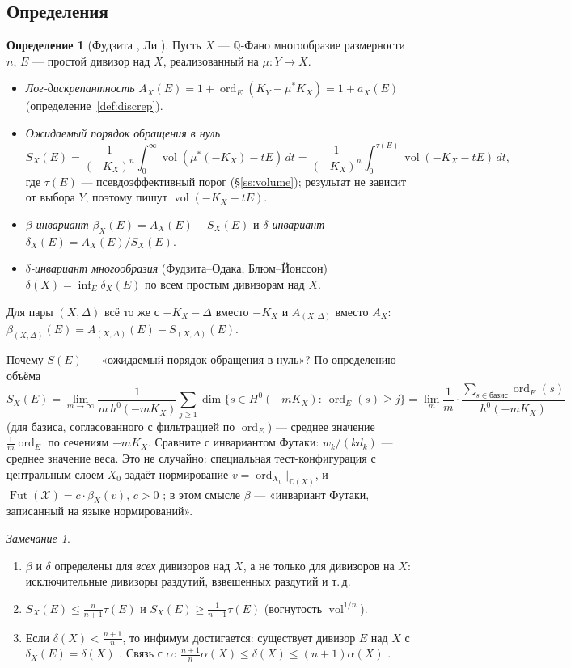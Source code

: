 \documentclass[11pt,a4paper]{article}
\theoremstyle{plain}
\theoremstyle{definition}
\newtheorem{definition}[theorem]{Определение}
\theoremstyle{remark}
\newtheorem{remark}[theorem]{Замечание}
\renewcommand{\C}{\mathbb{C}}
\newcommand{\Q}{\mathbb{Q}}
\newcommand{\cX}{\mathcal{X}}
\DeclareMathOperator{\ord}{ord}
\DeclareMathOperator{\vol}{vol}
\DeclareMathOperator{\Fut}{Fut}
\begin{document}
\subsection{Определения}

\begin{definition}[{Фудзита \cite{Fuj19b}, Ли \cite{Li17}}]\label{def:beta}
Пусть $X$ --- $\Q$-Фано многообразие размерности $n$, $E$ --- простой дивизор над $X$,
реализованный на $\mu\colon Y\to X$.
\begin{itemize}
\item \emph{Лог-дискрепантность} $A_X(E)=1+\ord_E(K_Y-\mu^*K_X)=1+a_X(E)$ (определение~\ref{def:discrep}).
\item \emph{Ожидаемый порядок обращения в нуль}
\[
S_X(E)=\frac1{(-K_X)^n}\int_0^\infty\vol(\mu^*(-K_X)-tE)\,dt=\frac1{(-K_X)^n}\int_0^{\tau(E)}\vol(-K_X-tE)\,dt ,
\]
где $\tau(E)$ --- псевдоэффективный порог (\S\ref{ss:volume}); результат не зависит от выбора
$Y$, поэтому пишут $\vol(-K_X-tE)$.
\item \emph{$\beta$-инвариант} $\beta_X(E)=A_X(E)-S_X(E)$ и \emph{$\delta$-инвариант}
$\delta_X(E)=A_X(E)/S_X(E)$.
\item \emph{$\delta$-инвариант многообразия} (Фудзита--Одака, Блюм--Йонссон)
$\delta(X)=\inf_E\delta_X(E)$ по всем простым дивизорам над $X$.
\end{itemize}
Для пары $(X,\Delta)$ всё то же с $-K_X-\Delta$ вместо $-K_X$ и $A_{(X,\Delta)}$ вместо $A_X$:
$\beta_{(X,\Delta)}(E)=A_{(X,\Delta)}(E)-S_{(X,\Delta)}(E)$.
\end{definition}

Почему $S(E)$ --- «ожидаемый порядок обращения в нуль»? По определению объёма
\[
S_X(E)=\lim_{m\to\infty}\frac1{m\,h^0(-mK_X)}\sum_{j\ge1}\dim\{s\in H^0(-mK_X):\ \ord_E(s)\ge j\}
=\lim_m\frac{1}{m}\cdot\frac{\sum_{s\in\text{базис}}\ord_E(s)}{h^0(-mK_X)}
\]
(для базиса, согласованного с фильтрацией по $\ord_E$) --- среднее значение $\frac1m\ord_E$ по
сечениям $-mK_X$. Сравните с инвариантом Футаки: $w_k/(kd_k)$ --- среднее значение веса. Это не
случайно: специальная тест-конфигурация с центральным слоем $X_0$ задаёт нормирование
$v=\ord_{X_0}|_{\C(X)}$, и $\Fut(\cX)=c\cdot\beta_X(v)$, $c>0$ \cite{Fuj19b, Li17}; в этом смысле
$\beta$ --- «инвариант Футаки, записанный на языке нормирований».

\begin{remark}
\begin{enumerate}
\item $\beta$ и $\delta$ определены для \emph{всех} дивизоров над $X$, а не только для
дивизоров на $X$: исключительные дивизоры раздутий, взвешенных раздутий и т.\,д.
\item $S_X(E)\le\frac n{n+1}\tau(E)$ и $S_X(E)\ge\frac1{n+1}\tau(E)$ (вогнутость $\vol^{1/n}$).
\item Если $\delta(X)<\frac{n+1}n$, то инфимум достигается: существует дивизор $E$ над $X$ с
$\delta_X(E)=\delta(X)$ \cite{LXZ}. Связь с $\alpha$: $\frac{n+1}n\alpha(X)\le\delta(X)\le(n+1)\alpha(X)$ \cite{BJ}.
\end{enumerate}
\end{remark}
\end{document}
